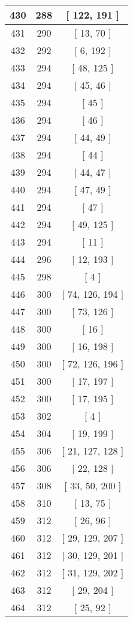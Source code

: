\begin{center}
\begin{longtable}[H]{|| c c c ||}
\hline
430 & 288 & [ 122, 191 ] \\ 
\hline
431 & 290 & [ 13, 70 ] \\ 
\hline
432 & 292 & [ 6, 192 ] \\ 
\hline
433 & 294 & [ 48, 125 ] \\ 
\hline
434 & 294 & [ 45, 46 ] \\ 
\hline
435 & 294 & [ 45 ] \\ 
\hline
436 & 294 & [ 46 ] \\ 
\hline
437 & 294 & [ 44, 49 ] \\ 
\hline
438 & 294 & [ 44 ] \\ 
\hline
439 & 294 & [ 44, 47 ] \\ 
\hline
440 & 294 & [ 47, 49 ] \\ 
\hline
441 & 294 & [ 47 ] \\ 
\hline
442 & 294 & [ 49, 125 ] \\ 
\hline
443 & 294 & [ 11 ] \\ 
\hline
444 & 296 & [ 12, 193 ] \\ 
\hline
445 & 298 & [ 4 ] \\ 
\hline
446 & 300 & [ 74, 126, 194 ] \\ 
\hline
447 & 300 & [ 73, 126 ] \\ 
\hline
448 & 300 & [ 16 ] \\ 
\hline
449 & 300 & [ 16, 198 ] \\ 
\hline
450 & 300 & [ 72, 126, 196 ] \\ 
\hline
451 & 300 & [ 17, 197 ] \\ 
\hline
452 & 300 & [ 17, 195 ] \\ 
\hline
453 & 302 & [ 4 ] \\ 
\hline
454 & 304 & [ 19, 199 ] \\ 
\hline
455 & 306 & [ 21, 127, 128 ] \\ 
\hline
456 & 306 & [ 22, 128 ] \\ 
\hline
457 & 308 & [ 33, 50, 200 ] \\ 
\hline
458 & 310 & [ 13, 75 ] \\ 
\hline
459 & 312 & [ 26, 96 ] \\ 
\hline
460 & 312 & [ 29, 129, 207 ] \\ 
\hline
461 & 312 & [ 30, 129, 201 ] \\ 
\hline
462 & 312 & [ 31, 129, 202 ] \\ 
\hline
463 & 312 & [ 29, 204 ] \\ 
\hline
464 & 312 & [ 25, 92 ] \\ 

\end{longtable}
\end{center}
